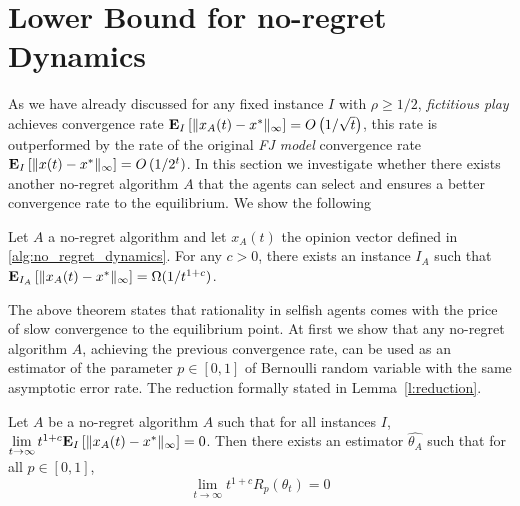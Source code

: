 \section{Lower Bound for no-regret Dynamics}\label{s:lower_bound}

As we have already discussed for any fixed instance $I$ with
$\rho\geq 1/2$, \emph{fictitious play} achieves convergence rate
$\bm{\mathrm{E}}_{I} \left[ \| x_A(t)-x^* \|_{\infty} \right]=O\left(1/\sqrt{t}\right)$,
this rate is outperformed by the rate of the original \emph{FJ model}
convergence rate
$\bm{\mathrm{E}}_{I} \left[ \| x(t)-x^* \|_{\infty} \right]=O\left(1/2^{t}\right)$.
In this section we investigate whether there exists another no-regret
algorithm $A$ that the agents can select and ensures a better convergence rate
to the equilibrium.  We show the following
\begin{theorem}\label{t:dynamics_lower_bound}
  Let $A$ a no-regret algorithm and let $x_A(t)$ the
  opinion vector defined in \ref{alg:no_regret_dynamics}.
  For any $c>0$, there exists an instance $I_A$ such that
  $\bm{\mathrm{E}}_{I_A} \left[ \| x_A(t)-x^* \|_{\infty} \right] = \Omega(1/t^{1+c})$.
\end{theorem}

The above theorem states that rationality in selfish agents comes with
the price of slow convergence to the equilibrium point.
At first we show that any no-regret algorithm $A$, achieving the previous
convergence rate, can be used as an estimator of the parameter
$p \in [0,1] $ of Bernoulli random variable
with the same asymptotic error rate. The reduction formally stated in
Lemma~\ref{l:reduction}.

\begin{lemma}\label{l:reduction}

  Let $A$ be a no-regret algorithm $A$ such that for all instances $I$,
  $\lim \limits_{t \rightarrow \infty} t^{1+c}
  \bm{\mathrm{E}}_{I} \left[ \| x_A(t)-x^* \|_{\infty} \right]=0$.
  Then there exists an estimator $\hat{\theta_A}$ such that
  for all $p \in [0,1]$,
  \[\lim_{t \rightarrow \infty}t^{1+c}R_p(\theta_t)=0\]

\end{lemma}

